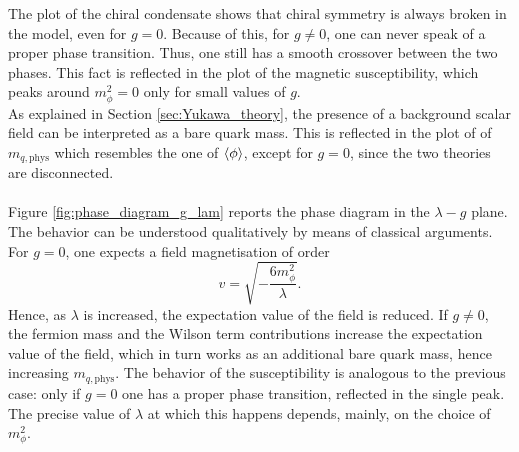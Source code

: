 The plot of the chiral condensate shows that chiral symmetry is always broken in the model, even for $g=0$. Because of this, for $g \neq 0$, one can never speak of a proper phase transition. Thus, one still has a smooth crossover between the two phases. This fact is reflected in the plot of the magnetic susceptibility, which peaks around $m_\phi^2 = 0$ only for small values of $g$. \\
As explained in Section \ref{sec:Yukawa_theory}, the presence of a background scalar field can be interpreted as a bare quark mass. This is reflected in the plot of of $m_{q, \text{phys}}$ which resembles the one of $\left\langle \phi \right\rangle$, except for $g=0$, since the two theories are disconnected. \\~\\
Figure \ref{fig:phase_diagram_g_lam} reports the phase diagram in the $\lambda - g$ plane. The behavior can be understood qualitatively by means of classical arguments. 
For $g=0$, one expects a field magnetisation of order 
\begin{equation*}
    v = \sqrt{-\frac{6 m_\phi^2}{\lambda}}.
\end{equation*}
Hence, as $\lambda$ is increased, the expectation value of the field is reduced.
If $g \neq 0$, the fermion mass and the Wilson term contributions increase the expectation value of the field, which in turn works as an additional bare quark mass, hence increasing $m_{q, \text{phys}}$. The behavior of the susceptibility is analogous to the previous case: only if $g=0$ one has a proper phase transition, reflected in the single peak.
The precise value of $\lambda$ at which this happens depends, mainly, on the choice of $m_\phi^2$.
